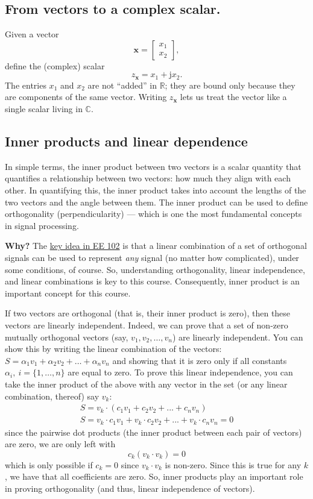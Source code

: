 \documentclass{ee102_notes}
\begin{document}
\subsection{From vectors to a complex scalar.}
Given a vector
\[
\mathbf{x}=\begin{bmatrix}x_1\\ x_2\end{bmatrix},
\]
define the (complex) scalar
\[
z_{\mathbf{x}}=x_1+\mathrm{j}x_2.
\]
The entries $x_1$ and $x_2$ are not ``added'' in $\mathbb{R}$; they are bound
only because they are components of the same vector. Writing $z_{\mathbf{x}}$
lets us treat the vector like a single scalar living in $\mathbb{C}$.

\subsection{Inner products and linear dependence}
In simple terms, the inner product between two vectors is a scalar quantity that quantifies a relationship between two vectors: how much they align with each other. In quantifying this, the inner product takes into account the lengths of the two vectors and the angle between them. The inner product can be used to define orthogonality (perpendicularity) --- which is one the most fundamental concepts in signal processing.

\textbf{Why?} The \ul{key idea in EE 102} is that a linear combination of a set of orthogonal signals can be used to represent \textit{any} signal (no matter how complicated), under some conditions, of course. So, understanding orthogonality, linear independence, and linear combinations is key to this course. Consequently, inner product is an important concept for this course.

If two vectors are orthogonal (that is, their inner product is zero), then these vectors are linearly independent. Indeed, we can prove that a set of non-zero mutually orthogonal vectors (say, $v_1, v_2, \ldots, v_n$) are linearly independent. You can show this by writing the linear combination of the vectors: $
S = \alpha_1 v_1 + \alpha_2 v_2 + \ldots + \alpha_n v_n$ and showing that it is zero only if all constants $\alpha_i, \: i = \{1, \ldots, n\}$ are equal to zero. To prove this linear independence, you can take the inner product of the above with any vector in the set (or any linear combination, thereof) say $v_k$:
\begin{align*}
S = v_k \cdot (c_1v_1 + c_2v_2 + ... + c_nv_n)\\
S = v_k \cdot c_1v_1 + v_k \cdot c_2v_2 + ... + v_k \cdot c_nv_n = 0
\end{align*}
since the pairwise dot products (the inner product between each pair of vectors) are zero, we are only left with
\[
c_k (v_k \cdot v_k) = 0
\]
which is only possible if $c_k = 0$ since $v_k \cdot v_k$ is non-zero. Since this is true for any $k$, we have that all coefficients are zero. So, inner products play an important role in proving orthogonality (and thus, linear independence of vectors). 
\end{document}
